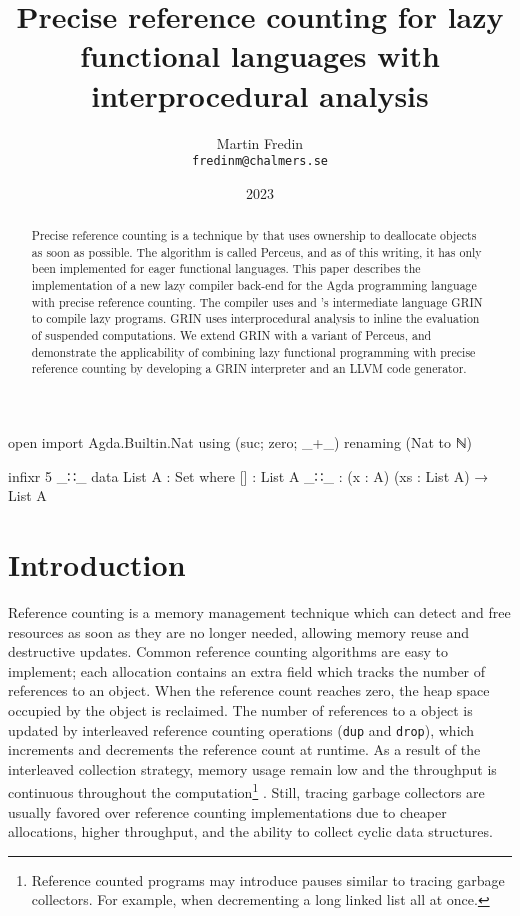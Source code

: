 \documentclass[10pt, twocolumn]{article}
\title{ Precise reference counting for lazy functional languages with interprocedural analysis}
\author{Martin Fredin \\ \texttt{fredinm@chalmers.se}}
\date{2023}
\begin{document}
\maketitle


\begin{code}[hide]
open import Agda.Builtin.Nat using (suc; zero; _+_) renaming (Nat to ℕ) 

infixr 5 _∷_
data List A : Set where
  []  : List A
  _∷_ : (x : A) (xs : List A) → List A
\end{code}

\begin{abstract}
Precise reference counting is a technique by \citeauthor{reinking2021} that uses ownership to deallocate objects as soon as possible. 
The algorithm is called Perceus, and as of this writing, it has only been implemented for eager functional languages.
This paper describes the implementation of a new lazy compiler back-end for the Agda programming language with 
precise reference counting. 
The compiler uses \citeauthor{boquist1999} and \citeauthor{johnsson1991}'s intermediate language GRIN to compile lazy programs. 
GRIN uses interprocedural analysis to inline the evaluation of suspended computations.
We extend GRIN with a variant of Perceus, and demonstrate the applicability of combining lazy functional programming with precise reference counting by developing a GRIN interpreter and an LLVM code generator. 

\end{abstract}

\section{Introduction}

Reference counting \citep{collins1960} is a memory management technique which can detect and free resources as soon as they are no longer needed, allowing memory reuse and destructive updates. 
Common reference counting algorithms are easy to implement; each allocation contains an extra field which tracks the number of references to an object. 
When the reference count reaches zero, the heap space occupied by the object is reclaimed.
The number of references to a object is updated by interleaved reference counting operations (\texttt{dup} and \texttt{drop}), which increments and decrements the reference count at runtime. 
As a result of the interleaved collection strategy, memory usage remain low and the throughput is continuous throughout the computation\footnote{Reference counted programs may introduce pauses similar to tracing garbage collectors. For example, when decrementing a long linked list all at once.} \citep{jones1996}.
Still, tracing garbage collectors are usually favored over reference counting implementations due to cheaper allocations, higher throughput, and the ability to collect cyclic data structures.
\end{document}

